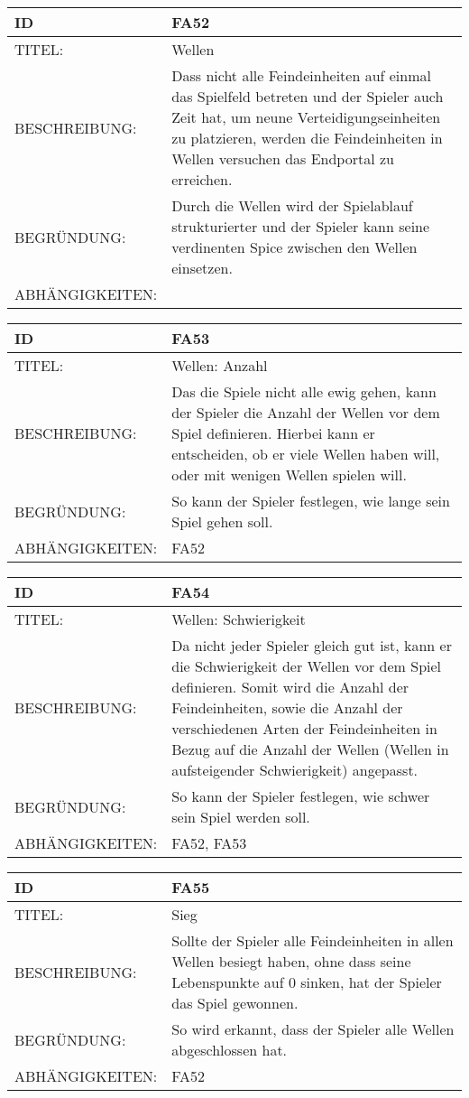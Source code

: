 \documentclass{uulm-assignment}
\begin{document}
\begin{tabularx}{16cm}{l|X}
\textbf{ID} & \textbf{FA52} \\
\hline
TITEL: & Wellen \\
\hline
BESCHREIBUNG: & Dass nicht alle Feindeinheiten auf einmal das Spielfeld betreten und der Spieler auch Zeit hat, um neune Verteidigungseinheiten zu platzieren, werden die Feindeinheiten in Wellen versuchen das Endportal zu erreichen. 
\\ 
\hline
BEGRÜNDUNG: & Durch die Wellen wird der Spielablauf strukturierter und der Spieler kann seine verdinenten Spice zwischen den Wellen einsetzen. \\
\hline
ABHÄNGIGKEITEN: & \\
\end{tabularx}

\begin{tabularx}{16cm}{l|X}
\textbf{ID} & \textbf{FA53} \\
\hline
TITEL: & Wellen: Anzahl \\ 
\hline
BESCHREIBUNG: & Das die Spiele nicht alle ewig gehen, kann der Spieler die Anzahl der Wellen vor dem Spiel definieren. Hierbei kann er entscheiden, ob er viele Wellen haben will, oder mit wenigen Wellen spielen will.
\\
\hline
BEGRÜNDUNG: & So kann der Spieler festlegen, wie lange sein Spiel gehen soll. \\
\hline
ABHÄNGIGKEITEN: &FA52 \\ 
\end{tabularx}

\begin{tabularx}{16cm}{l|X}
\textbf{ID} & \textbf{FA54} \\
\hline
TITEL: & Wellen: Schwierigkeit \\ 
\hline
BESCHREIBUNG: & Da nicht jeder Spieler gleich gut ist, kann er die Schwierigkeit der Wellen vor dem Spiel definieren. Somit wird die Anzahl der Feindeinheiten, sowie die Anzahl der verschiedenen Arten der Feindeinheiten in Bezug auf die Anzahl der Wellen (Wellen in aufsteigender Schwierigkeit) angepasst.
\\
\hline
BEGRÜNDUNG: & So kann der Spieler festlegen, wie schwer sein Spiel werden soll.\\
\hline
ABHÄNGIGKEITEN: & FA52, FA53\\ 
\end{tabularx}

\begin{tabularx}{16cm}{l|X}
\textbf{ID} & \textbf{FA55} \\
\hline
TITEL: & Sieg \\
\hline
BESCHREIBUNG: & Sollte der Spieler alle Feindeinheiten in allen Wellen besiegt haben, ohne dass seine Lebenspunkte auf 0 sinken, hat der Spieler das Spiel gewonnen.
\\
\hline
BEGRÜNDUNG: & So wird erkannt, dass der Spieler alle Wellen abgeschlossen hat. \\
\hline
ABHÄNGIGKEITEN: & FA52\\
\end{tabularx}
\end{document}
